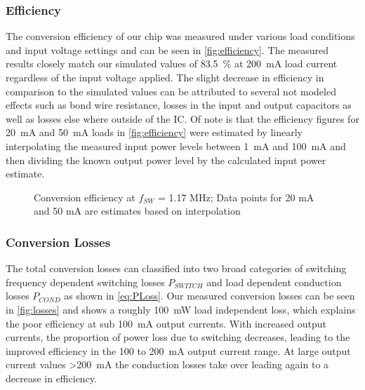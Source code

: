 %    
\subsubsection{Efficiency}
\label{sec:efficiency}

The conversion efficiency of our chip was measured under various load conditions and input voltage settings and can be seen in \autoref{fig:efficiency}. The measured results closely match our simulated values of \qty{83.5}{\percent} at \qty{200}{\milli\ampere} load current regardless of the input voltage applied. The slight decrease in efficiency in comparison to the simulated values can be attributed to several not modeled effects such as bond wire resistance, losses in the input and output capacitors as well as losses else where outside of the \ac{IC}. Of note is that the efficiency figures for \qty{20}{\milli\ampere} and \qty{50}{\milli\ampere} loads in \autoref{fig:efficiency} were estimated by linearly interpolating the measured input power levels between \qty{1}{\milli\ampere} and \qty{100}{\milli\ampere} and then dividing the known output power level by the calculated input power estimate.
\begin{figure}[h]
    \centering
    
    \caption{Conversion efficiency at $f_{SW}$ = 1.17 MHz; Data points for 20 mA and 50 mA are estimates based on interpolation}
    \label{fig:efficiency}
\end{figure}
\clearpage
\subsubsection{Conversion Losses}
\label{sec:losses}
The total conversion losses can classified into two broad categories of switching frequency dependent switching losses $P_{SWITCH}$ and load dependent conduction losses $P_{COND}$ as shown in \autoref{eq:PLoss}. Our measured conversion losses can be seen in \autoref{fig:losses} and shows a roughly \qty{100}{\milli\watt} load independent loss, which explains the poor efficiency at sub \qty{100}{\milli\ampere} output currents. With increased output currents, the proportion of power loss due to switching decreases, leading to the improved efficiency in the 100 to \qty{200}{\milli\ampere} output current range. At large output current values >\qty{200}{\milli\ampere} the conduction losses take over leading again to a decrease in efficiency.

